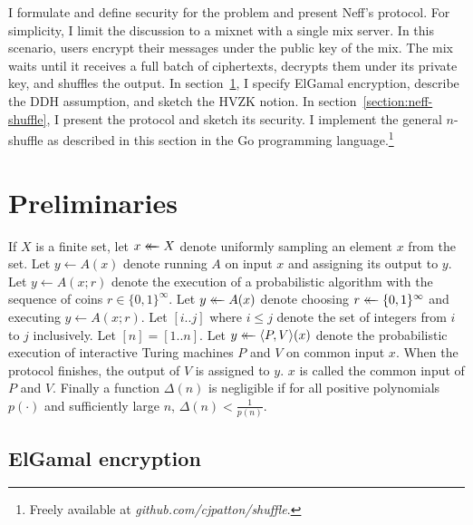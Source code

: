 \documentclass[letter]{article}
\newcounter{foot}
\newcommand{\bits}{\{0,1\}}
\newcommand{\getsr}{\mathrel{\leftarrow\mkern-14mu\leftarrow}}
\newcommand{\brackets}[1]{\langle #1 \rangle}
\begin{document}
I formulate and define security for the problem and present Neff's protocol.
For simplicity, I limit the discussion to a mixnet with a single mix server. In
this scenario, users encrypt their messages under the public key of the mix. The
mix waits until it receives a full batch of ciphertexts, decrypts them under its
private key, and shuffles the output. In section~\ref{section:prelim}, I specify
ElGamal encryption, describe the DDH assumption, and sketch the HVZK notion. In
section~\ref{section:neff-shuffle}, I present the protocol and sketch its
security. I implement the general $n$-shuffle as described in this section in
the Go programming language.\footnote{ Freely available at {\it
github.com/cjpatton/shuffle}.}

\section{Preliminaries} \label{section:prelim}

If $X$ is a finite set, let $x \getsr X$ denote uniformly sampling an
element $x$ from the set. Let $y \gets A(x)$ denote running $A$ on input $x$ and
assigning its output to $y$. Let $y \gets A(x; r)$ denote the execution of a
probabilistic algorithm with the sequence of coins $r \in \bits^\infty$. Let $y
\getsr A(x)$ denote choosing $r \getsr \bits^\infty$ and executing $y \gets
A(x; r)$. Let $[i..j]$ where $i \le j$ denote the set of integers from $i$ to
$j$ inclusively.
Let $[n] = [1..n]$.
Let $y \getsr \brackets{P, V}(x)$ denote the probabilistic execution of
interactive Turing machines $P$ and $V$ on common input $x$. When the protocol
finishes, the output of $V$ is assigned to $y$.
$x$ is called the common input of $P$ and $V$.
Finally a function $\Delta(n)$ is
negligible if for all positive polynomials
$p(\cdot)$ and sufficiently large $n$, $\Delta(n) < \frac{1}{p(n)}$.


\subsection{ElGamal encryption}
\end{document}
